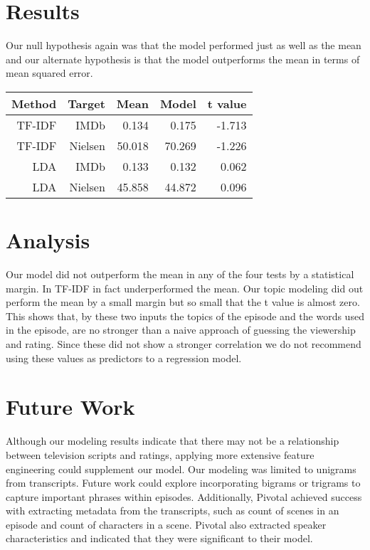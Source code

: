\documentclass{sig-alternate-05-2015}
\begin{document}
\section{Results}
Our null hypothesis again was that the model performed just as well as the mean and our alternate hypothesis is that the model outperforms the mean in terms of mean squared error. 
\begin{center}
\begin{tabular}{|r | r || r | r | r|} \hline
Method & Target & Mean & Model & t value \\ \hline\hline
 TF-IDF & IMDb & 0.134 & 0.175 & -1.713 \\ \hline
 TF-IDF & Nielsen & 50.018 & 70.269 & -1.226 \\ \hline \hline
LDA & IMDb & 0.133 & 0.132 & 0.062 \\ \hline
LDA & Nielsen & 45.858 & 44.872 & 0.096 \\ \hline
\end{tabular}
\end{center}

\section{Analysis}

Our model did not outperform the mean in any of the four tests by a statistical margin. In TF-IDF in fact underperformed the mean. Our topic modeling did out perform the mean by a small margin but so small that the t value is almost zero. This shows that, by these two inputs the topics of the episode and the words used in the episode, are no stronger than a naive approach of guessing the viewership and rating. Since these did not show a stronger correlation we do not recommend using these values as predictors to a regression model.

\section{Future Work}

Although our modeling results indicate that there may not be a relationship between television scripts and ratings, applying more extensive feature engineering could supplement our model. Our modeling was limited to unigrams from transcripts. Future work could explore incorporating bigrams or trigrams to capture important phrases within episodes. Additionally, Pivotal achieved success with extracting metadata from the transcripts, such as count of scenes in an episode and count of characters in a scene. Pivotal also extracted speaker characteristics and indicated that they were significant to their model.
\end{document}
